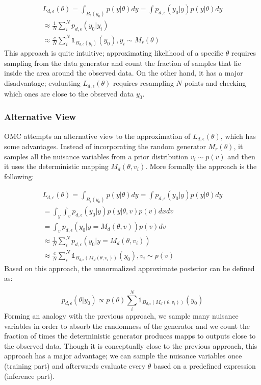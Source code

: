 \documentclass[11pt,twoside]{article}
\numberwithin{Theorem}{section}
\numberwithin{Definition}{section}
\numberwithin{Lemma}{section}
\numberwithin{Algorithm}{section}
\numberwithin{equation}{section}
\begin{document}
\begin{gather} \label{eq:primal_view}
  L_{d, \epsilon}(\theta)=\int_{B_\epsilon(y_0)}p(y|\theta)dy = \int p_{d,\epsilon}(y_0|y)p(y|\theta)dy\\
  \approx \frac{1}{N} \sum_i^N p_{d,\epsilon} (y_0|y_i) \\
  \approx \frac{c}{N} \sum_i^N \mathbb{1}_{B_{d,\epsilon}(y_i)} (y_0), y_i \sim M_r(\theta)
\end{gather}
%
This approach is quite intuitive; approximating likelihood of a specific $\theta$ requires sampling from the data generator and count the fraction of samples that lie inside the area around the observed data. On the other hand, it has a major disadvantage; evaluating $L_{d,\epsilon}(\theta)$ requires resampling $N$ points and checking which ones are close to the observed data $y_0$.

\subsubsection*{Alternative View}

OMC attempts an alternative view to the approximation of $L_{d,\epsilon}(\theta)$, which has some advantages. Instead of incorporating the random generator $M_r(\theta)$, it samples all the nuisance variables from a prior distribution $v_i \sim p(v)$ and then it uses the deterministic mapping $M_d(\theta, v_i)$. More formally the approach is the following:

\begin{gather} 
  L_{d,\epsilon}(\theta)=\int_{B_\epsilon(y_0)}p(y|\theta)dy = \int p_{d,\epsilon}(y_0|y)p(y|\theta)dy\\
  = \int_y \int_v p_{d,\epsilon}(y_0|y)p(y|\theta, v) p(v)dxdv \\
  = \int_v p_{d,\epsilon}(y_0|y=M_d(\theta, v)) p(v)dv \\
  \approx \frac{1}{N} \sum_i^N p_{d,\epsilon} (y_0|y=M_d(\theta, v_i)) \\
  \approx \frac{c}{N} \sum_i^N \mathbb{1}_{B_{d,\epsilon}(M_d(\theta, v_i))} (y_0), v_i \sim p(v)
  \label{eq:alt_view}
\end{gather}
%
Based on this approach, the unnormalized approximate posterior can be defined as:

\begin{equation} \label{eq:posterior}
  p_{d,\epsilon}(\theta|y_0) \propto p(\theta) \sum_i^N \mathbb{1}_{B_{d,\epsilon}(M_d(\theta, v_i))} (y_0)
  \end{equation}
%
Forming an analogy with the previous approach, we sample many nuisance variables in order to absorb the randomness of the generator and we count the fraction of times the deterministic generator produces mapps to outputs close to the observed data. Though it is conceptually close to the previous approach, this approach has a major advantage; we can sample the nuisance variables once (training part) and afterwards evaluate every $\theta$ based on a predefined expression (inference part).
\end{document}
